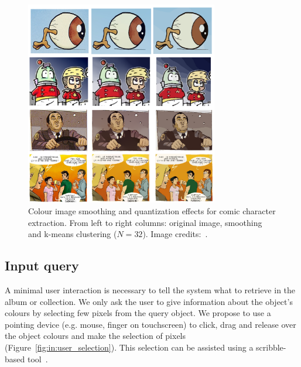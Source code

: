   \begin{figure}[h!]  %
    \centering
    \includegraphics[trim= 0px 0px 0px 0px, clip, width=0.75\textwidth]{smoothing_quatization.png}
    \caption[Colour image smoothing and quantization for comic character extraction]{Colour image smoothing and quantization effects for comic character extraction. From left to right columns: original image, smoothing~\cite{l0smoothing2011} and k-means clustering ($N=32$). Image credits:~\cite{Noeils11,Bubble08,Boston10,Lubbin12}.}
    \label{fig:in:smoothing_quantization}
  \end{figure}




\subsection{Input query}
\label{sec:in:input_query}
A minimal user interaction is necessary to tell the system what to retrieve in the album or collection.
We only ask the user to give information about the object's colours by selecting few pixels from the query object.
We propose to use a pointing device (e.g. mouse, finger on touchscreen) to click, drag and release over the object colours and make the selection of pixels (Figure~\ref{fig:in:user_selection}).
This selection can be assisted using a scribble-based tool~\cite{Xu2012LazySelection}.


